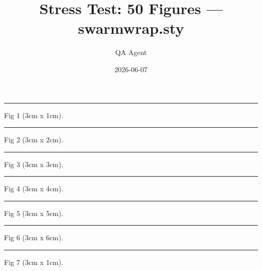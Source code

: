 \documentclass[a4paper,11pt]{article}
\title{Stress Test: 50 Figures — swarmwrap.sty}
\author{QA Agent}
\date{2026-06-07}
\begin{document}
\maketitle

\begin{swarmwrap}%
  \begin{minipage}[t]{3cm}
    \centering
    \rule{\linewidth}{1cm}
    {\footnotesize Fig 1 (3cm x 1cm).}
  \end{minipage}%
\end{swarmwrap}%
\swarmwrapnext
\lipsum[1]%

\begin{swarmwrap}%
  \begin{minipage}[t]{3cm}
    \centering
    \rule{\linewidth}{2cm}
    {\footnotesize Fig 2 (3cm x 2cm).}
  \end{minipage}%
\end{swarmwrap}%
\swarmwrapnext
\lipsum[2]%

\begin{swarmwrap}%
  \begin{minipage}[t]{3cm}
    \centering
    \rule{\linewidth}{3cm}
    {\footnotesize Fig 3 (3cm x 3cm).}
  \end{minipage}%
\end{swarmwrap}%
\swarmwrapnext
\lipsum[3]%

\begin{swarmwrap}%
  \begin{minipage}[t]{3cm}
    \centering
    \rule{\linewidth}{4cm}
    {\footnotesize Fig 4 (3cm x 4cm).}
  \end{minipage}%
\end{swarmwrap}%
\swarmwrapnext
\lipsum[4]%

\begin{swarmwrap}%
  \begin{minipage}[t]{3cm}
    \centering
    \rule{\linewidth}{5cm}
    {\footnotesize Fig 5 (3cm x 5cm).}
  \end{minipage}%
\end{swarmwrap}%
\swarmwrapnext
\lipsum[5]%

\begin{swarmwrap}%
  \begin{minipage}[t]{3cm}
    \centering
    \rule{\linewidth}{6cm}
    {\footnotesize Fig 6 (3cm x 6cm).}
  \end{minipage}%
\end{swarmwrap}%
\swarmwrapnext
\lipsum[6]%

\begin{swarmwrap}%
  \begin{minipage}[t]{3cm}
    \centering
    \rule{\linewidth}{1cm}
    {\footnotesize Fig 7 (3cm x 1cm).}
  \end{minipage}%
\end{swarmwrap}%
\swarmwrapnext
\lipsum[7]%
\end{document}
